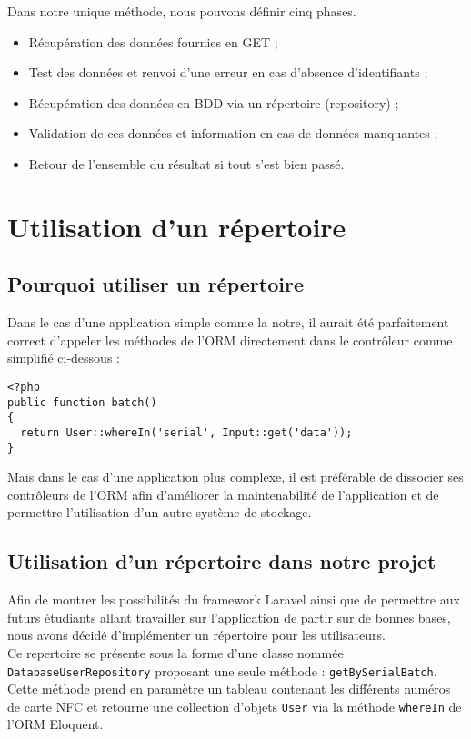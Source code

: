 Dans notre unique méthode, nous pouvons définir cinq phases.
\begin{itemize}
  \item Récupération des données fournies en GET ;
  \item Test des données et renvoi d'une erreur en cas d'absence d'identifiants ;
  \item Récupération des données en BDD via un répertoire (repository) ;
  \item Validation de ces données et information en cas de données manquantes ;
  \item Retour de l'ensemble du résultat si tout s'est bien passé.
\end{itemize}

\section{Utilisation d'un répertoire}

\subsection{Pourquoi utiliser un répertoire}

Dans le cas d'une application simple comme la notre, il aurait été parfaitement correct d'appeler les méthodes de l'ORM directement dans le contrôleur comme simplifié ci-dessous :
\begin{verbatim}
<?php
public function batch()
{
  return User::whereIn('serial', Input::get('data'));
}
\end{verbatim}

Mais dans le cas d'une application plus complexe, il est préférable de dissocier ses contrôleurs de l'ORM afin d'améliorer la maintenabilité de l'application et de permettre l'utilisation d'un autre système de stockage.

\subsection{Utilisation d'un répertoire dans notre projet}

Afin de montrer les possibilités du framework Laravel ainsi que de permettre aux futurs étudiants allant travailler sur l'application de partir sur de bonnes bases, nous avons décidé d'implémenter un répertoire pour les utilisateurs.\\

Ce repertoire se présente sous la forme d'une classe nommée \verb|DatabaseUserRepository| proposant une seule méthode : \verb|getBySerialBatch|. Cette méthode prend en paramètre un tableau contenant les différents numéros de carte NFC et retourne une collection d'objets \verb|User| via la méthode \verb|whereIn| de l'ORM Eloquent.\\

